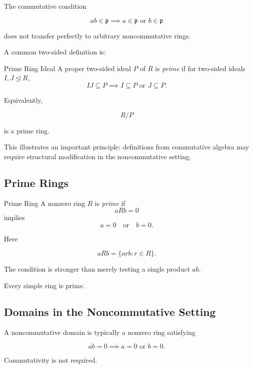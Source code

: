 The commutative condition

\[ ab\in\mathfrak p\implies a\in\mathfrak p\text{ or }b\in\mathfrak p \]

does not transfer perfectly to arbitrary noncommutative rings.

A common two-sided definition is:

\begin{definitionbox}{Prime Ring Ideal}
A proper two-sided ideal \(P\) of \(R\) is \emph{prime} if for two-sided
ideals \(I,J\trianglelefteq R\),
\[ IJ\subseteq P\implies I\subseteq P\text{ or }J\subseteq P. \]
\end{definitionbox}

Equivalently,

\[ R/P \]

is a prime ring.

This illustrates an important principle: definitions from commutative
algebra may require structural modification in the noncommutative setting.

\subsection{Prime Rings}
\label{subsec:prime-rings}

\begin{definitionbox}{Prime Ring}
A nonzero ring \(R\) is \emph{prime} if
\[ aRb=0 \]
implies
\[ a=0\quad\text{or}\quad b=0. \]
\end{definitionbox}

Here

\[ aRb=\{arb:r\in R\}. \]

The condition is stronger than merely testing a single product \(ab\).

Every simple ring is prime.

\subsection{Domains in the Noncommutative Setting}
\label{subsec:noncommutative-domains}

A noncommutative domain is typically a nonzero ring satisfying

\[ ab=0\implies a=0\text{ or }b=0. \]

Commutativity is not required.


